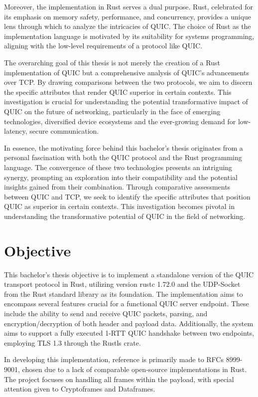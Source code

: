 Moreover, the implementation in Rust serves a dual purpose. Rust, celebrated for its emphasis on memory safety, performance, and concurrency, provides a unique lens through which to analyze the intricacies of QUIC. The choice of Rust as the implementation language is motivated by its suitability for systems programming, aligning with the low-level requirements of a protocol like QUIC. 

The overarching goal of this thesis is not merely the creation of a Rust implementation of QUIC but a comprehensive analysis of QUIC's advancements over TCP. By drawing comparisons between the two protocols, we aim to discern the specific attributes that render QUIC superior in certain contexts. This investigation is crucial for understanding the potential transformative impact of QUIC on the future of networking, particularly in the face of emerging technologies, diversified device ecosystems and the ever-growing demand for low-latency, secure communication.

In essence, the motivating force behind this bachelor's thesis originates from a personal fascination with both the QUIC protocol and the Rust programming language. The convergence of these two technologies presents an intriguing synergy, prompting an exploration into their compatibility and the potential insights gained from their combination. Through comparative assessments between QUIC and TCP, we seek to identify the specific attributes that position QUIC as superior in certain contexts. This investigation becomes pivotal in understanding the transformative potential of QUIC in the field of networking.

\section{Objective}

This bachelor's thesis objective is to implement a standalone version of the QUIC transport protocol in Rust, utilizing version rustc 1.72.0 and the UDP-Socket from the Rust standard library as its foundation. The implementation aims to encompass several features crucial for a functional QUIC server endpoint. These include the ability to send and receive QUIC packets, parsing, and encryption/decryption of both header and payload data. Additionally, the system aims to support a fully executed 1-RTT QUIC handshake between two endpoints, employing TLS 1.3 through the Rustls crate.

In developing this implementation, reference is primarily made to RFCs 8999-9001, chosen due to a lack of comparable open-source implementations in Rust. The project focuses on handling all frames within the payload, with special attention given to Cryptoframes and Dataframes.

